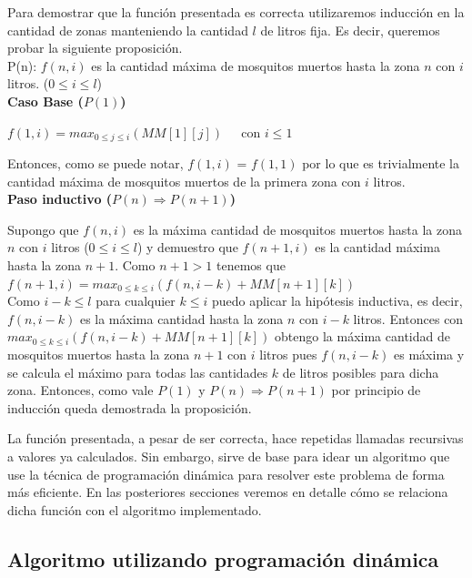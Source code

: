 \documentclass[a4paper,11pt] {article}
\begin{document}
Para demostrar que la funci\'on presentada es correcta utilizaremos inducci\'on en la cantidad de zonas manteniendo la cantidad $l$ de litros fija. Es decir, queremos probar la siguiente proposici\'on. \\

P(n): $f(n, i)$ es la cantidad m\'axima de mosquitos muertos hasta la zona $n$ con $i$ litros. ($0 \leq i \leq l$) \\

\textbf{Caso Base ($P(1)$)}

$f(1,i) = max_{0 \leq j \leq i} (MM[1][j]) \;\;\;\; $ con $i \leq 1$

Entonces, como se puede notar, $f(1,i)$ = $f (1,1)$ por lo que es trivialmente la cantidad m\'axima de mosquitos muertos de la primera zona con $i$ litros. \\

\textbf{Paso inductivo ($P(n) \Rightarrow P(n+1)$)}

Supongo que $f(n,i)$ es la m\'axima cantidad de mosquitos muertos hasta la zona $n$ con $i$ litros ($0 \leq i \leq l$) y demuestro que $f(n+1,i)$ es la cantidad m\'axima hasta la zona $n+1$.
Como $n+1 > 1$ tenemos que \\

$f(n+1,i) = max_{0 \leq k \leq i} (f(n, i-k) + MM[n+1][k])$ \\

Como $i - k \leq l$ para cualquier $k \leq i$ puedo aplicar la hip\'otesis inductiva, es decir, $f(n,i-k)$ es la m\'axima cantidad hasta la zona $n$ con $i-k$ litros. Entonces con $max_{0 \leq k \leq i} (f(n, i-k) + MM[n+1][k])$ obtengo la m\'axima cantidad de mosquitos muertos hasta la zona $n+1$ con $i$ litros pues $f(n,i-k)$ es m\'axima y se calcula el m\'aximo para todas las cantidades $k$ de litros posibles para dicha zona. Entonces, como vale $P(1)$ y $P(n) \Rightarrow P(n+1)$ por principio de inducci\'on queda demostrada la proposici\'on.

La funci\'on presentada, a pesar de ser correcta, hace repetidas llamadas recursivas a valores ya calculados. Sin embargo, sirve de base para idear un algoritmo que use la t\'ecnica de programaci\'on din\'amica para resolver este problema de forma m\'as eficiente. En las posteriores secciones veremos en detalle c\'omo se relaciona dicha funci\'on con el algoritmo implementado.

\subsection*{Algoritmo utilizando programaci\'on din\'amica}
\end{document}

